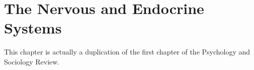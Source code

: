\documentclass[../Bio_chemistryReview.tex]{subfiles}
\begin{document}
\chapter{The Nervous and Endocrine Systems}
This chapter is actually a duplication of the first chapter of the Psychology
and Sociology Review.
\end{document}
